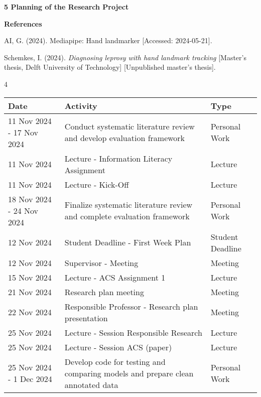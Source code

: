 \documentclass[
]{article}
\begin{document}
\textbf{5 Planning of the Research Project}

\textbf{References}

AI, G. (2024). Mediapipe: Hand landmarker {[}Accessed: 2024-05-21{]}.

Schemkes, I. (2024). \emph{Diagnosing leprosy with hand landmark
tracking} {[}Master's thesis, Delft University of Technology{]}
{[}Unpublished master's thesis{]}.

4

\begin{longtable}{p{} p{} p{}}
\toprule
\textbf{Date} & \textbf{Activity} & \textbf{Type} \\
\midrule
\endhead

11 Nov 2024 - 17 Nov 2024 & Conduct systematic literature review and develop evaluation framework & Personal Work \\

11 Nov 2024 & Lecture - Information Literacy Assignment & Lecture \\

11 Nov 2024 & Lecture - Kick-Off & Lecture \\

18 Nov 2024 - 24 Nov 2024 & Finalize systematic literature review and complete evaluation framework & Personal Work \\

12 Nov 2024 & Student Deadline - First Week Plan & Student Deadline \\

12 Nov 2024 & Supervisor - Meeting & Meeting \\

15 Nov 2024 & Lecture - ACS Assignment 1 & Lecture \\

21 Nov 2024 & Research plan meeting & Meeting \\

22 Nov 2024 & Responsible Professor - Research plan presentation & Meeting \\

25 Nov 2024 & Lecture - Session Responsible Research & Lecture \\

25 Nov 2024 & Lecture - Session ACS (paper) & Lecture \\

25 Nov 2024 - 1 Dec 2024 & Develop code for testing and comparing models and prepare clean annotated data & Personal Work \\


\end{longtable}
\end{document}

